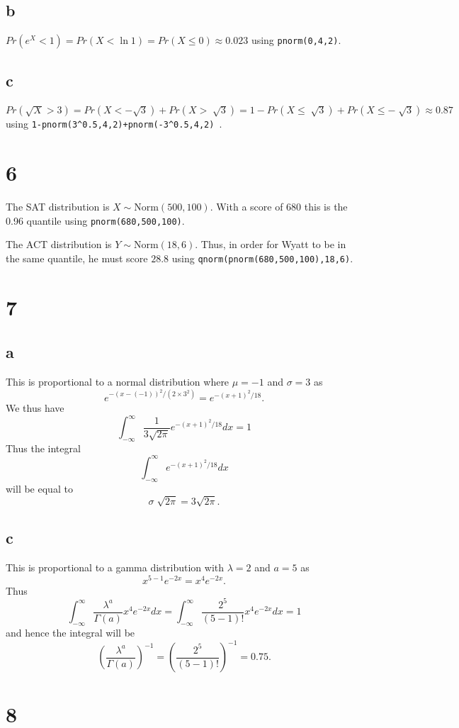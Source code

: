\documentclass[10pt]{article}
\begin{document}
\subsection*{b}
$Pr(e^X<1)=Pr(X<\ln 1)=Pr(X\le0)\approx0.023$ using \texttt{pnorm(0,4,2)}.
\subsection*{c}
$Pr(\sqrt{X}>3)=Pr(X<-\sqrt{3}) + Pr(X>\sqrt[]{3})=1-Pr(X\le\sqrt[]{3})+ Pr(X\le-\sqrt[]{3})\approx0.87$ using \texttt{1-pnorm(3\string^0.5,4,2)+pnorm(-3\string^0.5,4,2)
}.
\section*{6}
The SAT distribution is $X\sim\text{Norm}(500,100).$
With a score of $680$ this is the 0.96 quantile using \texttt{pnorm(680,500,100)}.

The ACT distribution is $Y\sim\text{Norm}(18,6).$ Thus, in order for Wyatt to be in the same quantile, he must score $28.8$ using \texttt{qnorm(pnorm(680,500,100),18,6)}.

\section*{7}
\subsection*{a}
This is proportional to a normal distribution where $\mu=-1$ and $\sigma=3$ as $$e^{-(x- (-1))^2/(2\times3^2)}=e^{-(x+1)^2/18}.$$ We thus have
\[\int_{-\infty}^{\infty}\frac{1}{3\sqrt{2\pi}}e^{-(x+1)^2/18}dx=1\]
Thus the integral 
\[\int_{-\infty}^{\infty}e^{-(x+1)^2/18}dx\]
will be equal to $$\sigma\sqrt[]{2\pi}=3\sqrt{2\pi}.$$

\subsection*{c}
This is proportional to a gamma distribution with $\lambda=2$ and $a=5$ as $$x^{5-1}e^{-2x}=x^{4}e^{-2x}.$$ Thus
\[\int_{-\infty}^\infty\frac{\lambda^a}{\Gamma(a)}x^{4}e^{-2x}dx=\int_{-\infty}^\infty\frac{2^5}{(5-1)!}x^{4}e^{-2x}dx=1\]
and hence the integral will be \[\left (\frac{\lambda^a}{\Gamma(a)}\right )^{-1} =\left (\frac{2^5}{(5-1)!}\right )^{-1}=0.75.\]

\section*{8}
\end{document}
